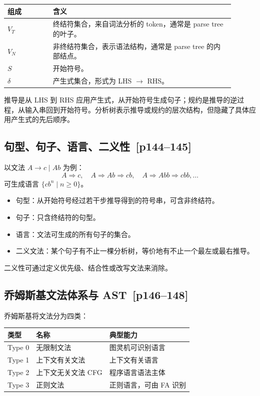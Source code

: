 \documentclass[UTF8,fontset=none,11pt]{ctexart}
\newcommand{\pg}[1]{\texorpdfstring{{\small\color{graytext}\,[p#1]}}{ [p#1]}}
\begin{document}
\begin{longtable}{L{0.18\linewidth}L{0.72\linewidth}}
\toprule
组成 & 含义 \\
\midrule
\(V_T\) & 终结符集合，来自词法分析的 token，通常是 parse tree 的叶子。\\
\(V_N\) & 非终结符集合，表示语法结构，通常是 parse tree 的内部结点。\\
\(S\) & 开始符号。\\
\(\delta\) & 产生式集合，形式为 LHS \(\to\) RHS。\\
\bottomrule
\end{longtable}

推导是从 LHS 到 RHS 应用产生式，从开始符号生成句子；规约是推导的逆过程，从输入串回到开始符号。分析树表示推导或规约的层次结构，但隐藏了具体应用产生式的先后顺序。

\subsection{句型、句子、语言、二义性 \pg{144--145}}

以文法 \(A\to c\mid Ab\) 为例：
\[
A\Rightarrow c,\quad
A\Rightarrow Ab\Rightarrow cb,\quad
A\Rightarrow Abb\Rightarrow cbb,\ldots
\]
可生成语言 \(\{cb^n\mid n\ge 0\}\)。

\begin{itemize}
  \item 句型：从开始符号经过若干步推导得到的符号串，可含非终结符。
  \item 句子：只含终结符的句型。
  \item 语言：文法可生成的所有句子的集合。
  \item 二义文法：某个句子有不止一棵分析树，等价地有不止一个最左或最右推导。
\end{itemize}

二义性可通过定义优先级、结合性或改写文法来消除。

\subsection{乔姆斯基文法体系与 AST \pg{146--148}}

乔姆斯基将文法分为四类：

\begin{center}
\small
\begin{tabular}{lll}
\toprule
类型 & 名称 & 典型能力 \\
\midrule
Type 0 & 无限制文法 & 图灵机可识别语言 \\
Type 1 & 上下文有关文法 & 上下文有关语言 \\
Type 2 & 上下文无关文法 CFG & 程序语言语法主体 \\
Type 3 & 正则文法 & 正则语言，可由 FA 识别 \\
\bottomrule
\end{tabular}
\end{center}
\end{document}
